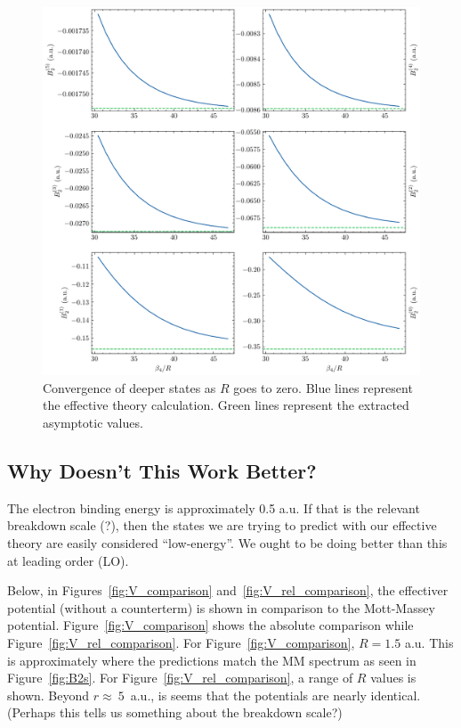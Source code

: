 \documentclass{article}
\begin{document}
\begin{figure}
  \centering
  \includegraphics[width=\linewidth]{figures/B2_convergence_panels.pdf}
  \caption{Convergence of deeper states as $R$ goes to zero. Blue lines
  represent the effective theory calculation. Green lines represent the
extracted asymptotic values.}\label{fig:B2_convergence_panels}
\end{figure}

\subsection{Why Doesn't This Work Better?}

The electron binding energy is approximately 0.5 a.u.
If that is the relevant breakdown scale (?), then the states we are trying to
predict with our effective theory are easily considered ``low-energy''.
We ought to be doing better than this at leading order (LO).

Below, in Figures~\ref{fig:V_comparison} and~\ref{fig:V_rel_comparison},
the effectiver potential (without a counterterm) is shown in comparison to the
Mott-Massey potential.
Figure~\ref{fig:V_comparison} shows the absolute comparison while
Figure~\ref{fig:V_rel_comparison}.
For Figure~\ref{fig:V_comparison}, $R = 1.5$ a.u.
This is approximately where the predictions match the MM spectrum as seen in
Figure~\ref{fig:B2s}.
For Figure~\ref{fig:V_rel_comparison}, a range of $R$ values is shown.
Beyond $r\approx~5$~a.u., is seems that the potentials are nearly identical.
(Perhaps this tells us something about the breakdown scale?)
\end{document}
